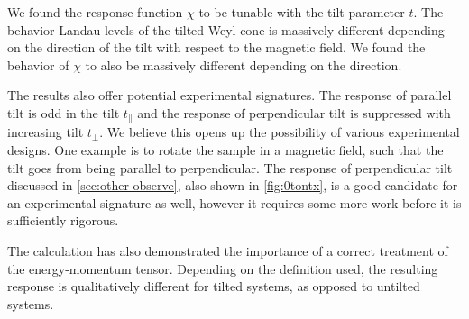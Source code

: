 We found the response function \( \chi \) to be tunable with the tilt parameter \( t \).
The behavior Landau levels of the tilted Weyl cone is massively different depending on the direction of the tilt with respect to the magnetic field.
We found the behavior of \( \chi \) to also be massively different depending on the direction.

The results also offer potential experimental signatures.
The response of parallel tilt is odd in the tilt \( t_\parallel \) and the response of perpendicular tilt is suppressed with increasing tilt \( t_\perp \).
We believe this opens up the possibility of various experimental designs.
One example is to rotate the sample in a magnetic field, such that the tilt goes from being parallel to perpendicular.
The response of perpendicular tilt discussed in \cref{sec:other-observe}, also shown in \cref{fig:0tontx}, is a good candidate for an experimental signature as well, however it requires some more work before it is sufficiently rigorous.

The calculation has also demonstrated the importance of a correct treatment of the energy-momentum tensor.
Depending on the definition used, the resulting response is qualitatively different for tilted systems, as opposed to untilted systems.

